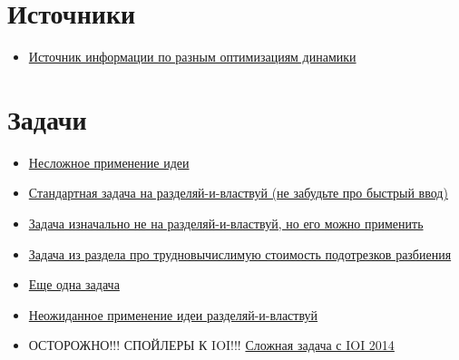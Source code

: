 


\section{Источники}

\begin{itemize}
    \item \href{https://codeforces.com/blog/entry/8219}{Источник информации по разным оптимизациям динамики}
\end{itemize}

\section{Задачи}

\begin{itemize}
    \item \href{https://codeforces.com/problemset/problem/673/E}{Несложное применение идеи}
    \item \href{https://codeforces.com/contest/321/problem/E}{Стандартная задача на разделяй-и-властвуй (не забудьте про быстрый ввод)}
    \item \href{https://codeforces.com/contest/1527/problem/E}{Задача изначально не на разделяй-и-властвуй, но его можно применить}
    \item \href{https://codeforces.com/contest/868/problem/F}{Задача из раздела про трудновычислимую стоимость подотрезков разбиения}
    \item \href{https://www.spoj.com/problems/LARMY/}{Еще одна задача}
    \item \href{https://oj.uz/problem/view/COI15_nafta}{Неожиданное применение идеи разделяй-и-властвуй}
    \item ОСТОРОЖНО!!! СПОЙЛЕРЫ К IOI!!! \href{https://oj.uz/problem/view/IOI14_holiday}{Сложная задача с IOI 2014}
\end{itemize}
